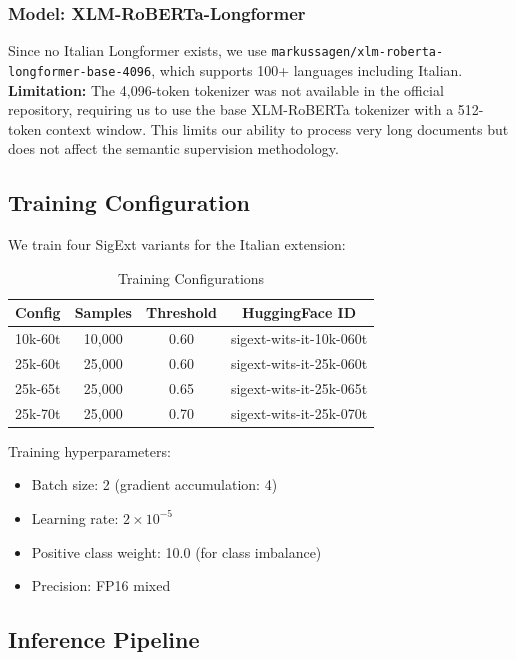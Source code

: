 \documentclass[conference]{IEEEtran}
\begin{document}
\subsubsection{Model: XLM-RoBERTa-Longformer}
Since no Italian Longformer exists, we use \texttt{markussagen/xlm-roberta-longformer-base-4096}, which supports 100+ languages including Italian. \textbf{Limitation:} The 4,096-token tokenizer was not available in the official repository, requiring us to use the base XLM-RoBERTa tokenizer with a 512-token context window. This limits our ability to process very long documents but does not affect the semantic supervision methodology.

\subsection{Training Configuration}

We train four SigExt variants for the Italian extension:

\begin{table}[htbp]
\caption{Training Configurations}
\begin{center}
\begin{tabular}{lccc}
\toprule
\textbf{Config} & \textbf{Samples} & \textbf{Threshold} & \textbf{HuggingFace ID} \\
\midrule
10k-60t & 10,000 & 0.60 & sigext-wits-it-10k-060t \\
25k-60t & 25,000 & 0.60 & sigext-wits-it-25k-060t \\
25k-65t & 25,000 & 0.65 & sigext-wits-it-25k-065t \\
25k-70t & 25,000 & 0.70 & sigext-wits-it-25k-070t \\
\bottomrule
\end{tabular}
\label{tab:configs}
\end{center}
\end{table}

Training hyperparameters:
\begin{itemize}
    \item Batch size: 2 (gradient accumulation: 4)
    \item Learning rate: $2 \times 10^{-5}$
    \item Positive class weight: 10.0 (for class imbalance)
    \item Precision: FP16 mixed
\end{itemize}

\subsection{Inference Pipeline}
\end{document}
